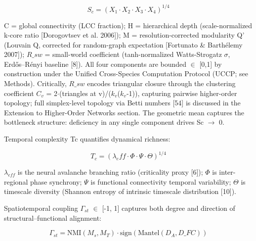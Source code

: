 \documentclass[a4paper,12pt]{article}
\begin{document}
\begin{equation}
S_c = (X_1 \cdot X_2 \cdot X_3 \cdot X_4)^{1/4} \tag{2}
\end{equation}


C = global connectivity (LCC fraction); H = hierarchical depth (scale-normalized k-core ratio [Dorogovtsev et al. 2006]); M = resolution-corrected modularity Q' (Louvain Q, corrected for random-graph expectation [Fortunato \& Barth\'elemy 2007]); $R\_{sw}$ = small-world coefficient (tanh-normalized Watts-Strogatz $\sigma$, Erd\H{o}s--R\'enyi baseline [8]).
All four components are bounded $\in$ [0,1] by construction under the Unified Cross-Species Computation Protocol (UCCP; see Methods).
Critically, $R\_{sw}$ encodes triangular closure through the clustering coefficient $C_{v}$ = 2$\cdot$(triangles at v)/($k_{v}$($k_{v}$-1)), capturing pairwise higher-order topology; full simplex-level topology via Betti numbers [54] is discussed in the Extension to Higher-Order Networks section.
The geometric mean captures the bottleneck structure: deficiency in any single component drives Sc $\rightarrow$ 0.


Temporal complexity Tc quantifies dynamical richness:


\begin{equation}
T_c = (\lambda_eff \cdot \Phi \cdot \Psi \cdot \Theta)^{1/4} \tag{3}
\end{equation}


$\lambda_{eff}$ is the neural avalanche branching ratio (criticality proxy [6]); $\Phi$ is inter-regional phase synchrony; $\Psi$ is functional connectivity temporal variability; $\Theta$ is timescale diversity (Shannon entropy of intrinsic timescale distribution [10]).


Spatiotemporal coupling $\Gamma_{st}$ $\in$ [-1, 1] captures both degree and direction of structural--functional alignment:


\begin{equation}
\Gamma_{st} = \text{NMI}(M_s, M_T) \cdot \text{sign}(\text{Mantel}(D_A, D\_{FC})) \tag{4}
\end{equation}
\end{document}
